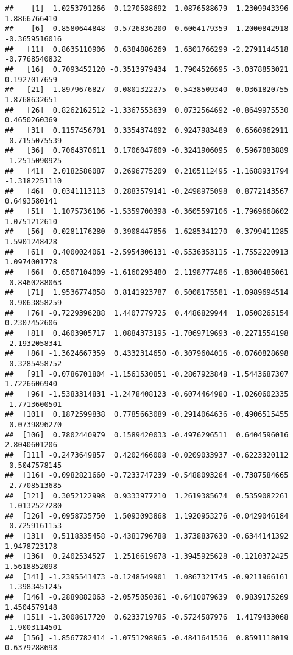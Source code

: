 \documentclass[
  12pt,
]{article}
\begin{document}
\begin{verbatim}
##    [1]  1.0253791266 -0.1270588692  1.0876588679 -1.2309943396  1.8866766410
##    [6]  0.8580644848 -0.5726836200 -0.6064179359 -1.2000842918 -0.3659516016
##   [11]  0.8635110906  0.6384886269  1.6301766299 -2.2791144518 -0.7768540832
##   [16]  0.7093452120 -0.3513979434  1.7904526695 -3.0378853021  0.1927017659
##   [21] -1.8979676827 -0.0801322275  0.5438509340 -0.0361820755  1.8768632651
##   [26]  0.8262162512 -1.3367553639  0.0732564692 -0.8649975530  0.4650260369
##   [31]  0.1157456701  0.3354374092  0.9247983489  0.6560962911 -0.7155075539
##   [36]  0.7064370611  0.1706047609 -0.3241906095  0.5967083889 -1.2515090925
##   [41]  2.0182586087  0.2696775209  0.2105112495 -1.1688931794 -1.3182251110
##   [46]  0.0341113113  0.2883579141 -0.2498975098  0.8772143567  0.6493580141
##   [51]  1.1075736106 -1.5359700398 -0.3605597106 -1.7969668602  1.0751212610
##   [56]  0.0281176280 -0.3908447856 -1.6285341270 -0.3799411285  1.5901248428
##   [61]  0.4000024061 -2.5954306131 -0.5536353115 -1.7552220913  1.0974001778
##   [66]  0.6507104009 -1.6160293480  2.1198777486 -1.8300485061 -0.8460288063
##   [71]  1.9536774058  0.8141923787  0.5008175581 -1.0989694514 -0.9063858259
##   [76] -0.7229396288  1.4407779725  0.4486829944  1.0508265154  0.2307452606
##   [81]  0.4603905717  1.0884373195 -1.7069719693 -0.2271554198 -2.1932058341
##   [86] -1.3624667359  0.4332314650 -0.3079604016 -0.0760828698 -0.3285458752
##   [91] -0.0786701804 -1.1561530851 -0.2867923848 -1.5443687307  1.7226606940
##   [96] -1.5383314831 -1.2478408123 -0.6074464980 -1.0260602335 -1.7713600501
##  [101]  0.1872599838  0.7785663089 -0.2914064636 -0.4906515455 -0.0739896270
##  [106]  0.7802440979  0.1589420033 -0.4976296511  0.6404596016  2.8040601206
##  [111] -0.2473649857  0.4202466008 -0.0209033937 -0.6223320112 -0.5047578145
##  [116] -0.0982821660 -0.7233747239 -0.5488093264 -0.7387584665 -2.7708513685
##  [121]  0.3052122998  0.9333977210  1.2619385674  0.5359082261 -1.0132527280
##  [126] -0.0958735750  1.5093093868  1.1920953276 -0.0429046184 -0.7259161153
##  [131]  0.5118335458 -0.4381796788  1.3738837630 -0.6344141392  1.9478723178
##  [136]  0.2402534527  1.2516619678 -1.3945925628 -0.1210372425  1.5618852098
##  [141] -1.2395541473 -0.1248549901  1.0867321745 -0.9211966161 -1.3983451245
##  [146] -0.2889882063 -2.0575050361 -0.6410079639  0.9839175269  1.4504579148
##  [151] -1.3008617720  0.6233719785 -0.5724587976  1.4179433068 -1.9003114501
##  [156] -1.8567782414 -1.0751298965 -0.4841641536  0.8591118019  0.6379288698

\end{verbatim}
\end{document}
